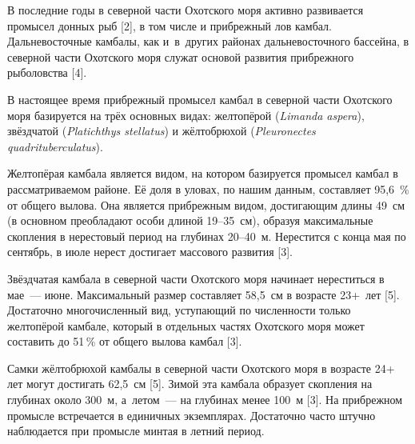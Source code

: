 



\makeProcTitleIVRazdel
{}



В последние годы в северной части Охотского моря активно развивается промысел донных рыб [2], в том числе и прибрежный лов камбал. Дальневосточные камбалы, как и~в~других районах дальневосточного бассейна, в северной части Охотского моря служат основой развития прибрежного рыболовства [4].

В настоящее время прибрежный промысел камбал в северной части Охотского моря базируется на трёх основных видах: желтопёрой (\textit{Limanda aspera}), звёздчатой (\textit{Platichthys stellatus}) и жёлтобрюхой (\textit{Pleuronectes quad\-ri\-tu\-ber\-culatus}).

Желтопёрая камбала является видом, на котором базируется промысел камбал в рассматриваемом районе. Её доля в уловах, по нашим данным, составляет 95,6~\% от общего вылова. Она является прибрежным видом, достигающим длины 49~см (в основном преобладают особи длиной 19--35~см), образуя максимальные скопления в нерестовый период на глубинах 20--40~м. Нерестится с конца мая по сентябрь, в июле нерест достигает массового развития [3].

Звёздчатая камбала в северной части Охотского моря начинает нереститься в мае~--- июне. Максимальный размер составляет 58,5~см в возрасте 23+~лет [5]. Достаточно многочисленный вид, уступающий по численности только желтопёрой камбале, который в отдельных частях Охотского моря может составить до 51\,\% от общего вылова камбал [3].

Самки жёлтобрюхой камбалы в северной части Охотского моря в возрасте 24+ лет могут достигать 62,5~см [5]. Зимой эта камбала образует скопления на глубинах около 300~м, а~летом~--- на глубинах менее 100~м [3]. На прибрежном промысле встречается в единичных экземплярах. Достаточно часто штучно наблюдается при промысле минтая в летний период.

